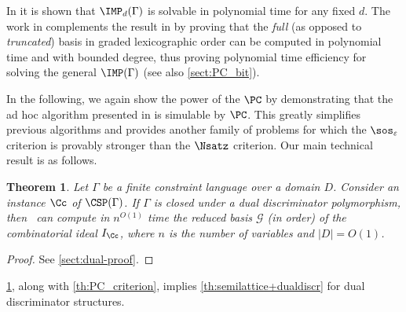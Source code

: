 \documentclass[11pt]{article}
\newtheorem{theorem}{Theorem}[section]
\begin{document}
In \cite{BulatovRSTOC22} it is shown that $\IMP_d(\Gamma)$ is solvable in polynomial time for any fixed $d$. The work in \cite{BharathiM21} complements the result in \cite{BulatovRSTOC22} by proving that the \textit{full} (as opposed to \textit{truncated}) \GB basis in graded lexicographic order can be computed in polynomial time and with bounded degree, thus proving polynomial time efficiency for solving the general $\IMP(\Gamma)$ (see also \cref{sect:PC_bit}).

In the following, we again show the power of the $\PC$ by demonstrating that the ad hoc algorithm presented in \cite{BharathiM21} is simulable by $\PC$. 
This greatly simplifies previous algorithms \cite{BulatovRSTOC22, BharathiM21, BharathiM22} and provides another family of problems for which the $\sos_{\varepsilon}$ criterion is provably stronger than the $\Nsatz$ criterion.
Our main technical result is as follows.
\begin{theorem}\label{th:dual_discriminator}
    Let $\Gamma$ be a finite constraint language over a domain $D$. Consider an instance $\Cc$ of $\CSP(\Gamma)$. If $\Gamma$ is closed under a dual discriminator polymorphism, then \PC\ can compute in $n^{O(1)}$ time the reduced \GB basis $\mathcal{G}$ (in \grlex order) of the combinatorial ideal $I_\Cc$, where $n$ is the number of variables and $|D|=O(1)$.
\end{theorem}
\begin{proof}
    See \cref{sect:dual-proof}.
\end{proof}
\cref{th:dual_discriminator}, along with \cref{th:PC_criterion}, implies \cref{th:semilattice+dualdiscr} for dual discriminator structures. 

\end{document}
